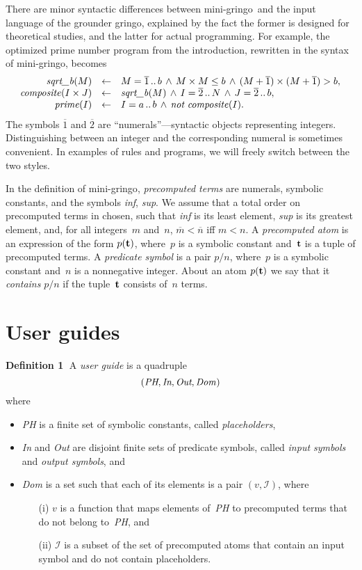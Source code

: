 \documentclass{new_tlp}
\def\ar{\leftarrow}
\def\beq{\begin{equation}}
\def\eeq#1{\label{#1}\end{equation}}
\def\ba{\begin{array}}
\def\ea{\end{array}}
\def\gringo{{\sc gringo}}
\def\num{\overline}
\newcommand{\I}{\mathcal{I}}
\begin{document}
There are minor syntactic differences between
mini-\gringo\ and the input language of the grounder \gringo,
explained by the fact the former is designed for theoretical studies, and the
latter for actual programming.
For example, the optimized prime number program from the introduction,
rewritten in the syntax of mini-\gringo, becomes
$$\ba {rcl}
\emph{sqrt\_b\/}(M) &\ar& M = \num  1\,..\,b \,\land\, M\times M \leq b
          \,\land\, (M+\num 1)\times(M+\num 1) > b,\\
          \emph{composite\/}(I\times J) &\ar& \emph{sqrt\_b\/}(M) \,\land\,
                 I = \num 2\,..\,N \,\land\, J = \num 2\,..\,b,\\
                 \emph{prime\/}(I) &\ar& I = a\,..\,b
                 \,\land\, \emph{not}\ \emph{composite\/}(I).
\ea
$$
The symbols $\num 1$ and $\num 2$ are ``numerals''---syntactic objects
representing integers. Distinguishing between an integer and the corresponding
numeral is sometimes convenient.  In examples of rules and programs, we will
freely switch between the two styles.

In the definition of mini-\gringo,
\emph{precomputed terms} are numerals,
  symbolic constants, and the symbols \emph{inf}, \emph{sup}.
  We assume that a total order on precomputed terms in chosen, such that
  \emph{inf} is its least element, \emph{sup} is its greatest element, and,
 for all integers~$m$ and~$n$,   $\num m < \num n$ iff $m<n$.
A  \emph{precomputed atom} is an expression of the form $p({\bf t})$, where~$p$
  is a symbolic constant and~$\bf t$ is a tuple of precomputed terms.
  A \emph{predicate symbol} is a pair $p/n$, where~$p$ is a symbolic
  constant and~$n$ is a nonnegative integer.  About an atom $p({\bf t})$ we
  say that it \emph{contains} $p/n$ if the tuple~$\bf t$ consists of~$n$
  terms.

\section{User guides}\label{sec:ug}

{\bf Definition 1}$\;$
A \emph{user guide} is a quadruple
\beq
(\emph{PH},\emph{In},\emph{Out},\emph{Dom\/})
\eeq{ug}
where
\begin{itemize}
\item \emph{PH} is a finite set of symbolic constants, called
  \emph{placeholders},
\item \emph{In} and \emph{Out} are disjoint finite sets of predicate
  symbols, called \emph{input symbols} and \emph{output symbols},
  and
\item \emph{Dom} is a set such that each of its elements is a pair $(v,\I)$,
  where
  \begin{itemize}
  \item [(i)]$v$ is a function that maps elements of~\emph{PH} to
      precomputed terms that do not belong to~\emph{PH}, and
    \item  [(ii)] $\I$ is a subset of the set of precomputed atoms that contain
      an input symbol and do not contain placeholders.
\end{itemize}
\end{itemize}
\end{document}
